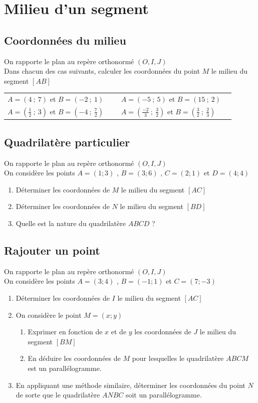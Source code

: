 \documentclass[oneside,12pt]{article}          %
\begin{document}
\section{Milieu d'un segment}

\subsection{Coordonnées du milieu}
On rapporte le plan au repère orthonormé $(O,I,J)$\\
Dans chacun des cas suivants, calculer les coordonnées du point $M$ le milieu du segment $[AB]$

\begin{tabular}{p{0.45\linewidth} p{0.45\linewidth}}
$A=(4~;~7)$ \quad et \quad $B=(-2~;~1)$ &  $A=(-5~;~5)$ \quad et \quad $B=(15~;~2)$  \\
$A=\left(\frac{1}{2}~;~3\right)$ \quad et \quad $B=\left(-4~;~\frac{7}{2}\right)$ &   $A=\left(\frac{-2}{3}~;~ \frac{3}{2}\right)$ \quad et \quad $B=\left(\frac{3}{2}~;~\frac{2}{3}\right)$
\end{tabular}



\subsection{Quadrilatère particulier}
On rapporte le plan au repère orthonormé $(O,I,J)$\\
On considère les points $A=(1;3)$ , $B=(3;6)$ , $C=(2;1)$ et $D=(4;4)$
\begin{enumerate}
	\item Déterminer les coordonnées de $M$ le milieu du segment $[AC]$
	\item Déterminer les coordonnées de $N$ le milieu du segment $[BD]$
	\item Quelle est la nature du quadrilatère $ABCD$ ?
\end{enumerate}



\subsection{Rajouter un point}
On rapporte le plan au repère orthonormé $(O,I,J)$\\
On considère les points $A=(3;4)$ , $B=(-1;1)$ et $C=(7;-3)$
\begin{enumerate}
	\item Déterminer les coordonnées de $I$ le milieu du segment $[AC]$
	\item On considère le point $M=(x;y)$
	\begin{enumerate}
		\item Exprimer en fonction de $x$ et de $y$ les coordonnées de $J$ le milieu du segment $[BM]$
		\item En déduire les coordonnées de $M$ pour lesquelles le quadrilatère $ABCM$ est un parallélogramme.
	\end{enumerate}
	\item En appliquant une méthode similaire, déterminer les coordonnées du point $N$ de sorte que le quadrilatère $ANBC$ soit un parallélogramme.
\end{enumerate}
\end{document}
